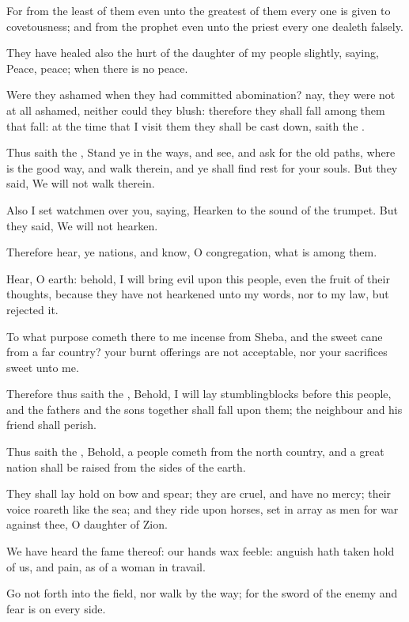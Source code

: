 \Verse For from the least of them even unto the greatest of them every one is given to covetousness; and from the prophet even unto the priest every one dealeth falsely.

\Verse They have healed also the hurt of the daughter of my people slightly, saying, Peace, peace; when there is no peace.

\Verse Were they ashamed when they had committed abomination? nay, they were not at all ashamed, neither could they blush: therefore they shall fall among them that fall: at the time that I visit them they shall be cast down, saith the \LORD.

\Verse Thus saith the \LORD, Stand ye in the ways, and see, and ask for the old paths, where is the good way, and walk therein, and ye shall find rest for your souls. But they said, We will not walk therein.

\Verse Also I set watchmen over you, saying, Hearken to the sound of the trumpet. But they said, We will not hearken.

\Verse Therefore hear, ye nations, and know, O congregation, what is among them.

\Verse Hear, O earth: behold, I will bring evil upon this people, even the fruit of their thoughts, because they have not hearkened unto my words, nor to my law, but rejected it.

\Verse To what purpose cometh there to me incense from Sheba, and the sweet cane from a far country? your burnt offerings are not acceptable, nor your sacrifices sweet unto me.

\Verse Therefore thus saith the \LORD, Behold, I will lay stumblingblocks before this people, and the fathers and the sons together shall fall upon them; the neighbour and his friend shall perish.

\Verse Thus saith the \LORD, Behold, a people cometh from the north country, and a great nation shall be raised from the sides of the earth.

\Verse They shall lay hold on bow and spear; they are cruel, and have no mercy; their voice roareth like the sea; and they ride upon horses, set in array as men for war against thee, O daughter of Zion.

\Verse We have heard the fame thereof: our hands wax feeble: anguish hath taken hold of us, and pain, as of a woman in travail.

\Verse Go not forth into the field, nor walk by the way; for the sword of the enemy and fear is on every side.

